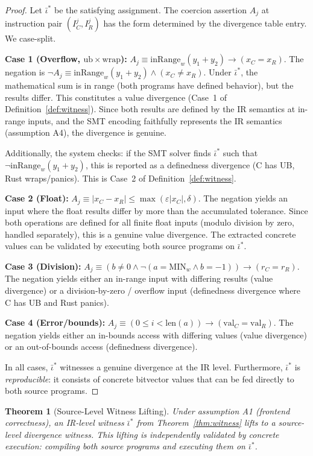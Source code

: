 \documentclass[11pt]{article}
\newtheorem{theorem}{Theorem}[section]
\newcommand{\inRange}{\mathrm{inRange}}
\begin{document}
\begin{proof}
Let $\bar{\iota}^*$ be the satisfying assignment. The coercion assertion $A_j$ at instruction pair $(I_C^j, I_R^j)$ has the form determined by the divergence table entry. We case-split.

\textbf{Case 1 (Overflow, $\mathrm{ub} \times \mathrm{wrap}$):} $A_j \equiv \inRange_w(y_1 + y_2) \to (x_C = x_R)$. The negation is $\neg A_j \equiv \inRange_w(y_1 + y_2) \wedge (x_C \neq x_R)$. Under $\bar{\iota}^*$, the mathematical sum is in range (both programs have defined behavior), but the results differ. This constitutes a value divergence (Case~1 of Definition~\ref{def:witness}). Since both results are defined by the IR semantics at in-range inputs, and the SMT encoding faithfully represents the IR semantics (assumption A4), the divergence is genuine.

Additionally, the system checks: if the SMT solver finds $\bar{\iota}^*$ such that $\neg\inRange_w(y_1 + y_2)$, this is reported as a definedness divergence (C has UB, Rust wraps/panics). This is Case~2 of Definition~\ref{def:witness}.

\textbf{Case 2 (Float):} $A_j \equiv |x_C - x_R| \leq \max(\varepsilon |x_C|, \delta)$. The negation yields an input where the float results differ by more than the accumulated tolerance. Since both operations are defined for all finite float inputs (modulo division by zero, handled separately), this is a genuine value divergence. The extracted concrete values can be validated by executing both source programs on $\bar{\iota}^*$.

\textbf{Case 3 (Division):} $A_j \equiv (b \neq 0 \wedge \neg(a = \mathrm{MIN}_w \wedge b = -1)) \to (r_C = r_R)$. The negation yields either an in-range input with differing results (value divergence) or a division-by-zero / overflow input (definedness divergence where C has UB and Rust panics).

\textbf{Case 4 (Error/bounds):} $A_j \equiv (0 \leq i < \mathrm{len}(a)) \to (\mathrm{val}_C = \mathrm{val}_R)$. The negation yields either an in-bounds access with differing values (value divergence) or an out-of-bounds access (definedness divergence).

In all cases, $\bar{\iota}^*$ witnesses a genuine divergence at the IR level. Furthermore, $\bar{\iota}^*$ is \emph{reproducible}: it consists of concrete bitvector values that can be fed directly to both source programs.
\end{proof}

\begin{theorem}[Source-Level Witness Lifting]
\label{thm:witness-lift}
Under assumption A1 (frontend correctness), an IR-level witness $\bar{\iota}^*$ from Theorem~\ref{thm:witness} lifts to a source-level divergence witness. This lifting is \emph{independently validated} by concrete execution: compiling both source programs and executing them on $\bar{\iota}^*$.
\end{theorem}
\end{document}
